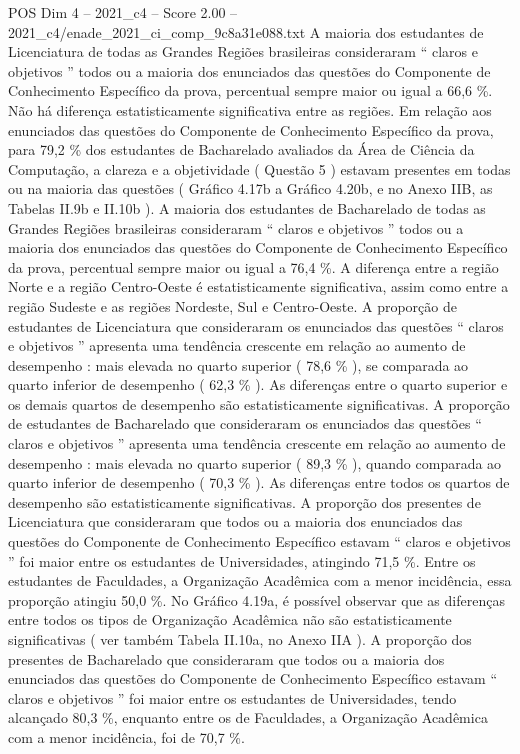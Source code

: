 \begin{textsample}{POS Dim 4 – 2021\_c4 – Score 2.00 – 2021\_c4/enade\_2021\_ci\_comp\_9c8a31e088.txt}
A maioria dos estudantes de Licenciatura de todas as Grandes Regiões brasileiras consideraram “ claros e objetivos ” todos ou a maioria dos enunciados das questões do Componente de Conhecimento Específico da prova, percentual sempre maior ou igual a 66,6 \%.
Não há diferença estatisticamente significativa entre as regiões.
Em relação aos enunciados das questões do Componente de Conhecimento Específico da prova, para 79,2 \% dos estudantes de Bacharelado avaliados da Área de Ciência da Computação, a clareza e a objetividade ( Questão 5 ) estavam presentes em todas ou na maioria das questões ( Gráfico 4.17b a Gráfico 4.20b, e no Anexo IIB, as Tabelas II.9b e II.10b ).
A maioria dos estudantes de Bacharelado de todas as Grandes Regiões brasileiras consideraram “ claros e objetivos ” todos ou a maioria dos enunciados das questões do Componente de Conhecimento Específico da prova, percentual sempre maior ou igual a 76,4 \%.
A diferença entre a região Norte e a região Centro-Oeste é estatisticamente significativa, assim como entre a região Sudeste e as regiões Nordeste, Sul e Centro-Oeste.
A proporção de estudantes de Licenciatura que consideraram os enunciados das questões “ claros e objetivos ” apresenta uma tendência crescente em relação ao aumento de desempenho : mais elevada no quarto superior ( 78,6 \% ), se comparada ao quarto inferior de desempenho ( 62,3 \% ).
As diferenças entre o quarto superior e os demais quartos de desempenho são estatisticamente significativas.
A proporção de estudantes de Bacharelado que consideraram os enunciados das questões “ claros e objetivos ” apresenta uma tendência crescente em relação ao aumento de desempenho : mais elevada no quarto superior ( 89,3 \% ), quando comparada ao quarto inferior de desempenho ( 70,3 \% ).
As diferenças entre todos os quartos de desempenho são estatisticamente significativas.
A proporção dos presentes de Licenciatura que consideraram que todos ou a maioria dos enunciados das questões do Componente de Conhecimento Específico estavam “ claros e objetivos ” foi maior entre os estudantes de Universidades, atingindo 71,5 \%.
Entre os estudantes de Faculdades, a Organização Acadêmica com a menor incidência, essa proporção atingiu 50,0 \%.
No Gráfico 4.19a, é possível observar que as diferenças entre todos os tipos de Organização Acadêmica não são estatisticamente significativas ( ver também Tabela II.10a, no Anexo IIA ).
A proporção dos presentes de Bacharelado que consideraram que todos ou a maioria dos enunciados das questões do Componente de Conhecimento Específico estavam “ claros e objetivos ” foi maior entre os estudantes de Universidades, tendo alcançado 80,3 \%, enquanto entre os de Faculdades, a Organização Acadêmica com a menor incidência, foi de 70,7 \%.

\end{textsample}
